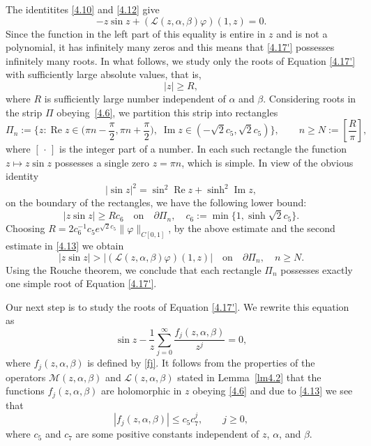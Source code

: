\documentclass[10pt, a4paper]{article}
\theoremstyle{plain}
\theoremstyle{definition}
\numberwithin{equation}{section}
\def\cL{\mathcal{L}}
\DeclareMathOperator{\RE}{Re}
\DeclareMathOperator{\IM}{Im}
\begin{document}
The identitites \eqref{4.10} and \eqref{4.12} give
\begin{equation}\label{4.17'}
-z\sin z +(\cL(z,\alpha, \beta)\varphi)(1, z)=0.
\end{equation}
Since the function in the left part of this equality is entire in $z$ and is not a polynomial, it has infinitely
many zeros and this means that \eqref{4.17'} possesses infinitely many roots. In what follows, we study only the roots
of Equation \eqref{4.17'} with sufficiently large absolute values, that is,
$$
|z|\geqslant R,
$$
where $R$ is sufficiently large number independent of $\alpha$ and $\beta$. Considering roots in the strip
$\Pi$ obeying~\eqref{4.6}, we partition this strip into rectangles
$$
\Pi_n:=\Big\{z: \RE z\in \Big(\pi n-\frac{\pi}{2}, \pi n+\frac{\pi}{2}\Big), \;
\IM z\in (-\sqrt{2}c_{5}, \sqrt{2}c_{5})\Big\}, \qquad n\geqslant N:=\left[\frac{R}{\pi}\right],
$$
where $[\,\cdot\,]$ is the integer part of a number. In each such rectangle the function $z\mapsto z\sin z$ possesses
a single zero $z=\pi n$, which is simple. In view of the obvious identity
$$
|\sin z|^2=\sin^2\RE z+\sinh^2\IM z,
$$
on the boundary of the rectangles, we have the following lower bound:
$$
|z\sin z|\geqslant Rc_{6} \quad \text{on} \quad \partial \Pi_n, \quad c_{6}:=\min\{1, \sinh \sqrt{2}c_{5}\}.
$$
Choosing $R=2c_{6}^{-1}c_{5} e^{\sqrt{2}c_{5}}\|\varphi\|_{C[0, 1]}$, by the above estimate and the second
estimate in \eqref{4.13} we obtain
$$
|z\sin z|>|(\cL(z,\alpha, \beta)\varphi)(1, z)| \quad \text{on} \quad \partial\Pi_n, \quad n\geqslant N.
$$
Using the Rouche theorem, we conclude that each rectangle $\Pi_n$ possesses exactly one simple root of Equation \eqref{4.17'}.

Our next step is to study the roots of Equation \eqref{4.17'}. We rewrite this equation as
\begin{equation}\label{eqforz}
\sin z-\frac{1}{z}\sum\limits_{j=0}^{\infty}\frac{f_j(z,\alpha, \beta)}{z^{j}}=0,
\end{equation}
where $f_j(z, \alpha, \beta)$ is defined by \eqref{fj}. It follows from the properties of the operators
$\mathcal{M}(z,\alpha, \beta)$ and $\cL(z,\alpha, \beta)$ stated in Lemma~\ref{lm4.2} that the
functions $f_j(z,\alpha, \beta)$ are holomorphic in $z$ obeying \eqref{4.6} and due to \eqref{4.13} we see that
\begin{equation}\label{4.14}
 |f_j(z,\alpha, \beta)|\leqslant c_{5}c_{7}^j,\qquad j\geqslant 0,
\end{equation}
where $c_{5}$ and $c_{7}$ are some positive constants independent of $z$, $\alpha$, and $\beta$.
\end{document}
